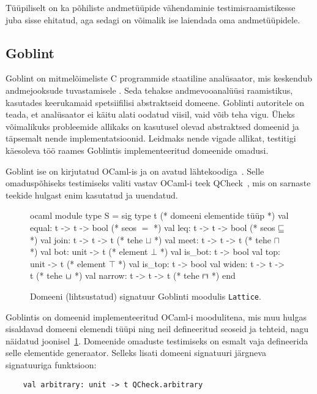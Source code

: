 \documentclass[../thesis.tex]{subfiles}
\begin{document}
Tüüpiliselt on ka põhiliste andmetüüpide vähendaminie testimisraamistikesse juba sisse ehitatud, aga sedagi on võimalik ise laiendada oma andmetüüpidele.

\subsection{Goblint}
Goblint on mitmelõimeliste C programmide staatiline analüsaator, mis keskendub andmejooksude tuvastamisele \cite{goblint2016}. Seda tehakse andmevooanalüüsi raamistikus, kasutades keerukamaid spetsiifilisi abstraktseid domeene. Goblinti autoritele on teada, et analüsaator ei käitu alati oodatud viisil, vaid võib teha vigu. Üheks võimalikuks probleemide allikaks on kasutusel olevad abstraktsed domeenid ja täpsemalt nende implementatsioonid. Leidmaks nende vigade allikat, testitigi käesoleva töö raames Goblintis implementeeritud domeenide omadusi.

Goblint ise on kirjutatud OCaml-is ja on avatud lähtekoodiga~\cite{goblint_repo}. Selle omaduspõhiseks testimiseks valiti vastav OCaml-i teek QCheck~\cite{qcheck_repo}, mis on sarnaste teekide hulgast enim kasutatud ja uuendatud.

\begin{figure}
	\centering
	\begin{bminted}[mathescape]{ocaml}
		module type S =
		sig
		  type t (* domeeni elementide tüüp *)
		  val equal: t -> t -> bool (* seos $=$ *)
		  val leq: t -> t -> bool (* seos $\sqsubseteq$ *)
		  val join: t -> t -> t (* tehe $\sqcup$ *)
		  val meet: t -> t -> t (* tehe $\sqcap$ *)
		  val bot: unit -> t (* element $\bot$ *)
		  val is_bot: t -> bool
		  val top: unit -> t (* element $\top$ *)
		  val is_top: t -> bool
		  val widen: t -> t -> t (* tehe $\widen$ *)
		  val narrow: t -> t -> t (* tehe $\narrow$ *)
		end
	\end{bminted}
	\caption{Domeeni (lihtsustatud) signatuur Goblinti moodulis \texttt{Lattice}.}
	\label{fig:lattice-s}
\end{figure}

Goblintis on domeenid implementeeritud OCaml-i moodulitena, mis muu hulgas sisaldavad domeeni elemendi tüüpi ning neil defineeritud seoseid ja tehteid, nagu näidatud joonisel~\ref{fig:lattice-s}. Domeenide omaduste testimiseks on esmalt vaja defineerida selle elementide generaator. Selleks lisati domeeni signatuuri järgneva signatuuriga funktsioon:
\begin{verbatim}
	val arbitrary: unit -> t QCheck.arbitrary
\end{verbatim}
\end{document}
